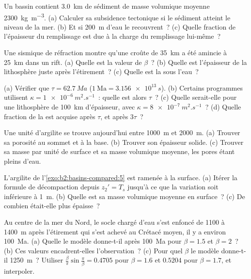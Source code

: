 \begin{exercise}[$\star$]\label{exo:b2:basins-compared:2}
Un bassin contient \qty{3.0}{km} de sédiment de masse volumique moyenne \qty{2300}{kg.m^{-3}}. (a) Calculer sa
subsidence tectonique si le sédiment atteint le niveau de la mer. (b) Et si \qty{200}{m} d'eau le recouvrent~?
(c) Quelle fraction de l'épaisseur du remplissage est due à la charge du remplissage lui-même~?
\end{exercise}

\begin{exercise}[$\star$]\label{exo:b2:basins-compared:3}
Une sismique de réfraction montre qu'une croûte de \qty{35}{km} a été amincie à \qty{25}{km} dans un rift.
(a) Quelle est la valeur de $\beta$~? (b) Quelle est l'épaisseur de la lithosphère juste après l'étirement~? (c) Quelle est la
 sous l'eau~?
\end{exercise}

\begin{exercise}[$\star$]\label{exo:b2:basins-compared:4}
(a) Vérifier que $\tau = \qty{62.7}{Ma}$ ($1~\text{Ma} = \qty{3.156e13}{s}$). (b) Certains programmes
utilisent $\kappa = \qty{1e-6}{m^2.s^{-1}}$~: quelle est alors $\tau$~? (c) Quelle serait-elle pour une
lithosphère de \qty{100}{km} d'épaisseur, avec $\kappa = \qty{8e-7}{m^2.s^{-1}}$~? (d) Quelle fraction de
la  est acquise après $\tau$, et après $3\tau$~?
\end{exercise}

\begin{exercise}[$\star\star$]\label{exo:b2:basins-compared:5}
Une unité d'argilite se trouve aujourd'hui entre \qty{1000}{m} et \qty{2000}{m}. (a) Trouver sa porosité au
sommet et à la base. (b) Trouver son épaisseur solide. (c) Trouver sa masse par unité de surface et sa masse
volumique moyenne, les pores étant pleins d'eau.
\end{exercise}

\begin{exercise}[$\star\star$]\label{exo:b2:basins-compared:6}
L'argilite de l'\cref{exo:b2:basins-compared:5} est ramenée à la surface. (a) Itérer la formule de décompaction
depuis $z_2' = T_s$ jusqu'à ce que la variation soit inférieure à \qty{1}{m}. (b) Quelle est sa masse volumique moyenne
en surface~? (c) De combien était-elle plus épaisse~?
\end{exercise}

\begin{exercise}[$\star\star$]\label{exo:b2:basins-compared:7}
Au centre de la mer du Nord, le socle chargé d'eau s'est enfoncé de 1100 à \qty{1400}{m} après
l'étirement qui s'est achevé au Crétacé moyen, il y a environ \qty{100}{Ma}. (a) Quelle 
le modèle donne-t-il après \qty{100}{Ma} pour $\beta = 1.5$ et $\beta = 2$~? (b) Ces valeurs encadrent-elles
l'observation~? (c) Pour quel $\beta$ le modèle donne-t-il \qty{1250}{m}~? Utiliser $\frac{\beta}{\pi}\sin\frac{\pi}{\beta} = 0.4705$ pour $\beta = 1.6$ et
$0.5204$ pour $\beta
= 1.7$, et interpoler.
\end{exercise}

